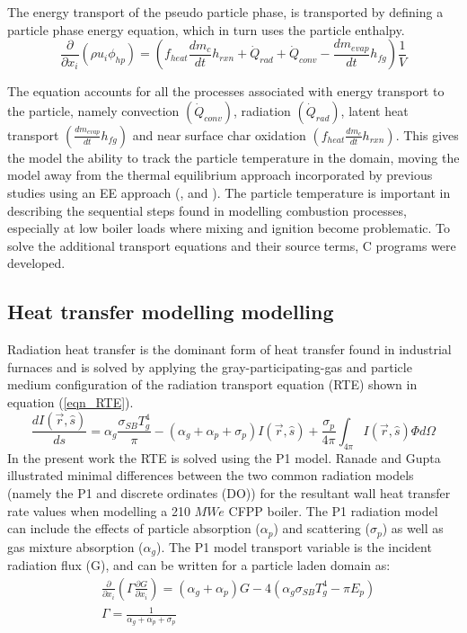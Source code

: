 \documentclass[review]{elsarticle}
\begin{document}
The energy transport of the pseudo particle phase, is transported by defining a particle phase energy equation, which in turn uses the particle enthalpy.
\begin{equation}\label{eqn_phi_hp}
\frac{\partial}{\partial x_{i}}(\rho u_{i} \phi_{hp})=\left(f_{heat}\frac{dm_{c}}{dt}h_{rxn} + \dot{Q}_{rad} + \dot{Q}_{conv} - \frac{dm_{evap}}{dt}h_{fg}\right)\frac{1}{V}
\end{equation}

The equation accounts for all the processes associated with energy transport to the particle, namely convection $\left(\dot{Q}_{conv}\right)$, radiation $\left(\dot{Q}_{rad}\right)$, latent heat transport $\left(\frac{dm_{evap}}{dt}h_{fg}\right)$ and near surface char oxidation $\left(f_{heat}\frac{dm_{c}}{dt}h_{rxn}\right)$. This gives the model the ability to track the particle temperature in the domain, moving the model away from the thermal equilibrium approach incorporated by previous studies using an EE approach (\cite{Benim2005}, \cite{Vicente2003} and \cite{Cai2015}). The particle temperature is important in describing the sequential steps found in modelling combustion processes, especially at low boiler loads where mixing and ignition become problematic. To solve the additional transport equations and their source terms, C programs were developed.

\subsection{Heat transfer modelling modelling}
Radiation heat transfer is the dominant form of heat transfer found in industrial furnaces \citep{Basu2000} and is solved by applying the gray-participating-gas and particle medium configuration of the radiation transport equation (RTE) \cite{Modest2013} shown in equation (\ref{eqn_RTE}).
\begin{equation}\label{eqn_RTE}
\frac{d I(\vec{r},\hat{s})}{ds} = \alpha_g \frac{\sigma_{SB} T_{g}^4}{\pi}-(\alpha_g+\alpha_p+\sigma_p)I(\vec{r},\hat{s}) + \frac{\sigma_p}{4\pi}\int_{4\pi}I(\vec{r},\hat{s})\Phi d \Omega
\end{equation}
In the present work the RTE is solved using the P1 model. Ranade and Gupta \cite{Ranade2015} illustrated minimal differences between the two common radiation models (namely the P1 and discrete ordinates (DO)) for the resultant wall heat transfer rate values when modelling a 210 $MWe$ CFPP boiler. The P1 radiation model can include the effects of particle absorption ($\alpha_p$) and scattering ($\sigma_p$) as well as gas mixture absorption ($\alpha_g$). The P1 model transport variable is the incident radiation flux (G), and can be written for a particle laden domain as:
\begin{equation}
\begin{split}
&\frac{\partial}{\partial x_{i}}\left(\Gamma\frac{\partial G}{\partial x_{i}}\right)=\left(\alpha_g+\alpha_p\right)G-4\left(\alpha_g \sigma_{SB} T_{g}^4-\pi E_p \right)\\
&\Gamma = \frac{1}{\alpha_g+\alpha_p+\sigma_p}
\end{split}
\end{equation}
\end{document}
